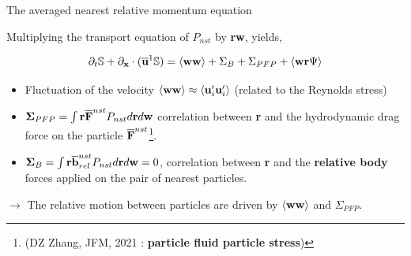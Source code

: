 \documentclass{sintefbeamer}
\begin{document}
\begin{frame}{The averaged nearest relative momentum equation}
  
  Multiplying the transport equation of $P_{nst}$ by \textbf{rw}, yields, 
  
  \begin{equation*}
    \partial_t \mathbb{S} 
  + \partial_{\textbf{x}} \cdot (
    \overline{\textbf{u}}^{1} 
    \mathbb{S})
  = \left<\textbf{w}\textbf{w}\right>
  + \Sigma_{B}
  + \Sigma_{PFP}
  + \left<\textbf{w}\textbf{r}\Psi\right>
\end{equation*}
  
  \begin{itemize}
      \item Fluctuation of the velocity $\left<\textbf{w}\textbf{w}\right> \approx \left<\textbf{u}_i'\textbf{u}_i'\right>$ (related to the Reynolds stress)
    \item $\mathbf{\Sigma}_{PFP} = \int \textbf{r} \overline{\textbf{F}}^{nst} P_{nst} d\textbf{r}d\textbf{w}$ correlation between \textbf{r} and the hydrodynamic  drag force on the particle $\overline{\textbf{F}}^{nst}$\footnote{(DZ Zhang, JFM, 2021 : \textbf{particle fluid particle stress})}. 
    \item $\mathbf{\Sigma}_{B} = \int \textbf{r} \overline{\textbf{b}}^{nst}_{rel} P_{nst} d\textbf{r}d\textbf{w} = 0$, correlation between \textbf{r} and the \textbf{relative body} forces applied on the pair of nearest particles.
  \end{itemize}
  
  $\rightarrow$  The relative motion between particles are driven by $\left<\textbf{w}\textbf{w}\right>$ and $\Sigma_{PFP}$.
  
  \end{frame}
  
\end{document}
